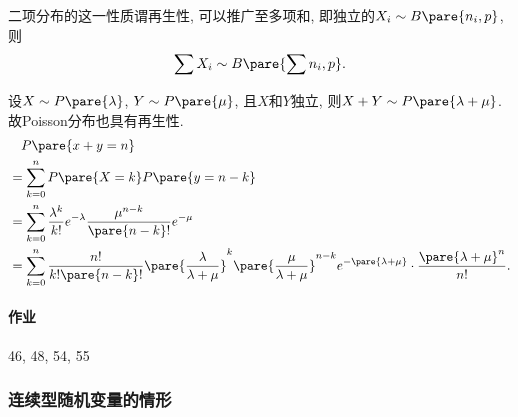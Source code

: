 \documentclass{ctexart}
\begin{document}
二项分布的这一性质谓再生性, 可以推广至多项和, 即独立的$X_i \sim B\pare{n_i,p}$, 则
\[ \sum X_i \sim B\pare{\sum n_i, p}. \]
\begin{sample}
    \begin{ex}
        设$X\sim P\pare{\lambda}$, $Y\sim P\pare{\mu}$, 且$X$和$Y$独立, 则$X+Y \sim P\pare{\lambda + \mu}$. 故Poisson分布也具有再生性.
        \begin{align*}
            &\phantom{=} \, P\pare{x+y = n} \\
            &= \sum_{k=0}^n P\pare{X=k} P\pare{y=n-k} \\
            &= \sum_{k=0}^n \frac{\lambda^k}{k!}e^{-\lambda} \frac{\mu^{n-k}}{\pare{n-k}!}e^{-\mu} \\
            &= \sum_{k=0}^n \frac{n!}{k!\pare{n-k}!} \pare{\frac{\lambda}{\lambda + \mu}}^k \pare{\frac{\mu}{\lambda+\mu}}^{n-k} e^{-\pare{\lambda+\mu}} \cdot \frac{\pare{\lambda+\mu}^n}{n!}.
        \end{align*}
    \end{ex}
\end{sample}
\paragraph{作业} %
\label{par:作业}

46, 48, 54, 55


\subsubsection{连续型随机变量的情形} %
\label{ssub:连续型随机变量的情形}
\end{document}
